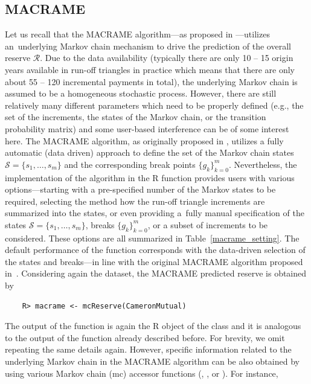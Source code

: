 \subsection{MACRAME}
\label{Rmacrame}
Let us recall that the MACRAME algorithm---as proposed in \cite{MMP2022}---utilizes an~underlying Markov chain mechanism to drive the prediction of the overall reserve $\mathcal{R}$. Due to the data availability (typically there are only 10 -- 15 origin years 
available in run-off triangles in practice which means that there are only about 55 -- 120 incremental payments in total), the underlying Markov chain 
is assumed to be a homogeneous stochastic process. However, there are still relatively many different parameters which need to be properly defined (e.g., the set of the increments, the states of the Markov chain, or the transition probability matrix) and some user-based 
interference can be of some interest here. The MACRAME algorithm, as originally proposed in \cite{MMP2022}, utilizes a fully automatic (data driven) approach to define the set of the Markov chain states $\mathcal{S} = \{s_1, \dots, s_m\}$ and the corresponding break points $\{g_k\}_{k = 0}^m$. Nevertheless, the implementation of the algorithm in the R function  provides users with various  options---starting with a pre-specified  number of the Markov states to be required, selecting the method how the run-off triangle increments are summarized into the states, or even providing a~fully manual specification of the states  $\mathcal{S} = \{s_1, \dots, s_m\}$, breaks $\{g_k\}_{k = 0}^m$, or a subset of increments to be considered. These options are all summarized in Table~\ref{macrame_setting}. The default performance of the  function corresponds with the data-driven selection of the states and breaks---in line with the original MACRAME algorithm proposed in~\cite{MMP2022}. 
Considering again the  dataset, the  MACRAME predicted reserve is obtained by
\begin{verbatim}
    R> macrame <- mcReserve(CameronMutual)
\end{verbatim}
The output of the  function is again the R object of the class  and it is analogous to the output of the  function already described before. For brevity, we omit repeating the same details again.  However, specific information related to the underlying Markov chain in the MACRAME algorithm can be also obtained by using various Markov chain (mc) accessor functions (, , or ). For instance, 
